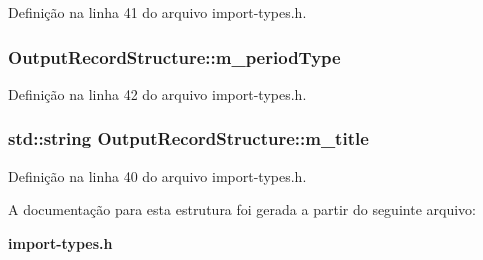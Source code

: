 Definição na linha 41 do arquivo import-\/types.\+h.

\subsubsection[{m\+\_\+period\+Type}]{ Output\+Record\+Structure\+::m\+\_\+period\+Type}\label{struct_output_record_structure_a1c27748dec5511e341017ba9fdd3bafa}


Definição na linha 42 do arquivo import-\/types.\+h.

\subsubsection[{m\+\_\+title}]{\setlength{\rightskip}{0pt plus 5cm}std\+::string Output\+Record\+Structure\+::m\+\_\+title}\label{struct_output_record_structure_a3959b5bab2767d4af06ffb9b8240901e}


Definição na linha 40 do arquivo import-\/types.\+h.



A documentação para esta estrutura foi gerada a partir do seguinte arquivo\+:\begin{DoxyCompactItemize}
\item 
{\bf import-\/types.\+h}\end{DoxyCompactItemize}
